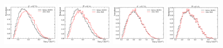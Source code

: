 \begin{figure}[ht]
    \centering
    \includegraphics[width=0.24\textwidth]{
        ./figs-supplemental-plots/Dstst-form-factors/DststTau/D0stst0Tau.pdf
    }
    \includegraphics[width=0.24\textwidth]{
        ./figs-supplemental-plots/Dstst-form-factors/DststTau/D0ststTau.pdf
    }
    \includegraphics[width=0.24\textwidth]{
        ./figs-supplemental-plots/Dstst-form-factors/DststTau/D1pstst0Tau.pdf
    }
    \includegraphics[width=0.24\textwidth]{
        ./figs-supplemental-plots/Dstst-form-factors/DststTau/D1pststTau.pdf
    }


\end{figure}
